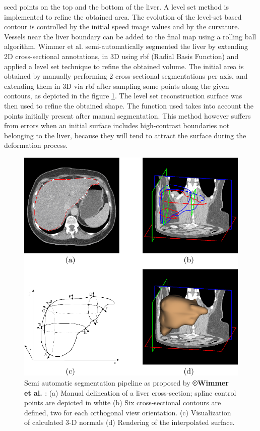 seed points on the top and the bottom of the liver. A level set method
is implemented to refine the obtained area. The evolution of the
level-set based contour is controlled by the initial speed image values
and by the curvature. Vessels near the liver boundary can be added to
the final map using a rolling ball algorithm.
Wimmer et al. \cite{Wimmer2007} semi-automatically segmented the liver by extending 2D cross-sectional annotations, in 3D using \ac{rbf} (Radial Basis Function) and applied a level set technique to refine the obtained volume. The initial area is obtained by manually performing 2 cross-sectional segmentations per axis, and extending them in 3D via \ac{rbf} after sampling some points along the given contours, as depicted in the figure \ref{Wimmer2007_Fig2}.
The level set reconstruction surface was then used to refine the
obtained shape. The function used takes into account the points
initially present after manual segmentation. This method however suffers
from errors when an initial surface includes high-contrast boundaries
not belonging to the liver, because they will tend to attract the
surface during the deformation process.


\begin{figure} [ht!]
	\centering
	\includegraphics[width=0.5\linewidth]{images/Wimmer2007_Fig2}
	\caption{Semi automatic segmentation pipeline as proposed by \textbf{©Wimmer et al. \cite{Wimmer2007}}: (a) Manual delineation of a liver cross-section; spline control points are depicted in white (b) Six cross-sectional contours are defined, two for each orthogonal view orientation. (c) Visualization of calculated 3-D normals (d) Rendering of the interpolated surface.}
	\label{Wimmer2007_Fig2}
\end{figure}



